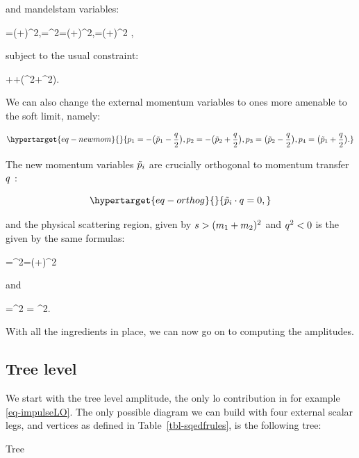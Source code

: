 \documentclass[
  10pt,
  a4paper,
  DIV=11,
  numbers=noendperiod,
  oneside]{scrreprt}
\let\[\relax \let\]\relax %
\DeclareRobustCommand{\[}{\begin{equation}}
\DeclareRobustCommand{\]}{\end{equation}}
\begin{document}
and mandelstam variables:

\[
 \mands=(\emom[1]+\emom[2])^2,\quad \mandt=\tm^2=(\emom[1]+\emom[4])^2,\quad \mandu=(\emom[1]+\emom[3])^2   ,
\]

subject to the usual constraint:

\[
\mands+\mandt+(\mass[1]^2+\mass[2]^2).
\]

We can also change the external momentum variables to ones more amenable
to the soft limit, namely:

\begin{equation}\protect\hypertarget{eq-newmom}{}{
\emom[1]=-\pa[\big]{\semom[1]-\Half[\tm]}, \emom[2]=-\pa[\big]{\semom[2]+\Half[\tm]}, \emom[3]=\pa[\big]{\semom[2]-\Half[\tm]}, \emom[4]=\pa[\big]{\semom[1]+\Half[\tm]} .
}\label{eq-newmom}\end{equation}

The new momentum variables \(\semom[i]\) are crucially orthogonal to
momentum transfer \(\tm\) :

\begin{equation}\protect\hypertarget{eq-orthog}{}{
\semom[i]\cdot\tm=0,
}\label{eq-orthog}\end{equation}

and the physical scattering region, given by
\(\mands>(\mass[1]+\mass[2])^2\) and \(\tm^2<0\) is the given by the
same formulas:

\[
\mands=\pa[\Big]{-\pa[\big]{\semom[1]-\Half[\tm]}-\pa[\big]{\semom[2]+\Half[\tm]}}^2=(\semom[1]+\semom[2])^2
\]

and

\[
\mandt=\pa[\Big]{-\pa[\big]{\semom[1]-\Half[\tm]}+\semom[1]+\Half[\tm]}^2 = \tm^2.
\]

With all the ingredients in place, we can now go on to computing the
amplitudes.

\hypertarget{tree-level}{%
\subsection{Tree level}\label{tree-level}}

We start with the tree level amplitude, the only \gls{lo} contribution
in for example \ref{eq-impulseLO}. The only possible diagram we can
build with four external scalar legs, and vertices as defined in
Table~\ref{tbl-sqedfrules}, is the following tree:

{
\makeatletter
\def\LT@makecaption#1#2#3{%
  \noalign{\smash{\hbox{\kern\textwidth\rlap{\kern\marginparsep
  \parbox[t]{\marginparwidth}{%
    \footnotesize{%
      \vspace{(1.1\baselineskip)}
    #1{#2: }\ignorespaces #3}}}}}}%
    }
\makeatother



Tree

}
\end{document}
